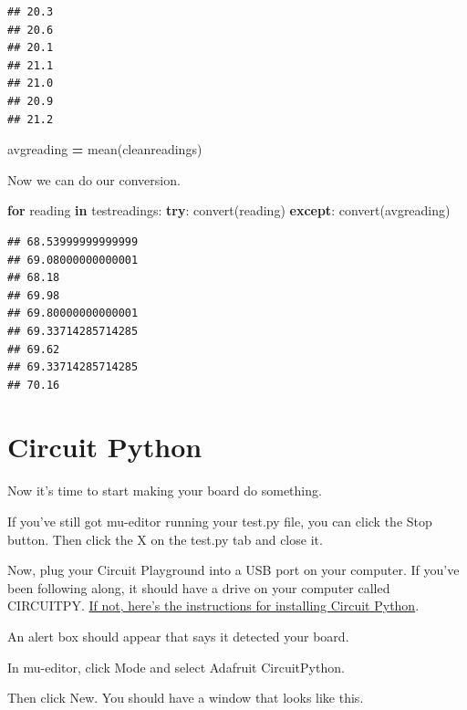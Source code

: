 \documentclass[
]{book}
\newenvironment{Shaded}{\begin{snugshade}}{\end{snugshade}}
\newcommand{\ControlFlowTok}[1]{\textcolor[rgb]{0.13,0.29,0.53}{\textbf{#1}}}
\newcommand{\KeywordTok}[1]{\textcolor[rgb]{0.13,0.29,0.53}{\textbf{#1}}}
\newcommand{\NormalTok}[1]{#1}
\newcommand{\OperatorTok}[1]{\textcolor[rgb]{0.81,0.36,0.00}{\textbf{#1}}}
\begin{document}
\begin{verbatim}
## 20.3
## 20.6
## 20.1
## 21.1
## 21.0
## 20.9
## 21.2
\end{verbatim}

\begin{Shaded}
\begin{Highlighting}[]
\NormalTok{avgreading }\OperatorTok{=}\NormalTok{ mean(cleanreadings)}
\end{Highlighting}
\end{Shaded}

Now we can do our conversion.

\begin{Shaded}
\begin{Highlighting}[]

\ControlFlowTok{for}\NormalTok{ reading }\KeywordTok{in}\NormalTok{ testreadings:}
    \ControlFlowTok{try}\NormalTok{:}
\NormalTok{        convert(reading)}
    \ControlFlowTok{except}\NormalTok{:}
\NormalTok{        convert(avgreading)}
\end{Highlighting}
\end{Shaded}

\begin{verbatim}
## 68.53999999999999
## 69.08000000000001
## 68.18
## 69.98
## 69.80000000000001
## 69.33714285714285
## 69.62
## 69.33714285714285
## 70.16
\end{verbatim}

\hypertarget{circuit-python}{%
\chapter{Circuit Python}\label{circuit-python}}

Now it's time to start making your board do something.

If you've still got mu-editor running your test.py file, you can click the Stop button. Then click the X on the test.py tab and close it.

Now, plug your Circuit Playground into a USB port on your computer. If you've been following along, it should have a drive on your computer called CIRCUITPY. \href{https://learn.adafruit.com/adafruit-circuit-playground-express/circuitpython-quickstart}{If not, here's the instructions for installing Circuit Python}.

An alert box should appear that says it detected your board.

In mu-editor, click Mode and select Adafruit CircuitPython.

Then click New. You should have a window that looks like this.
\end{document}
